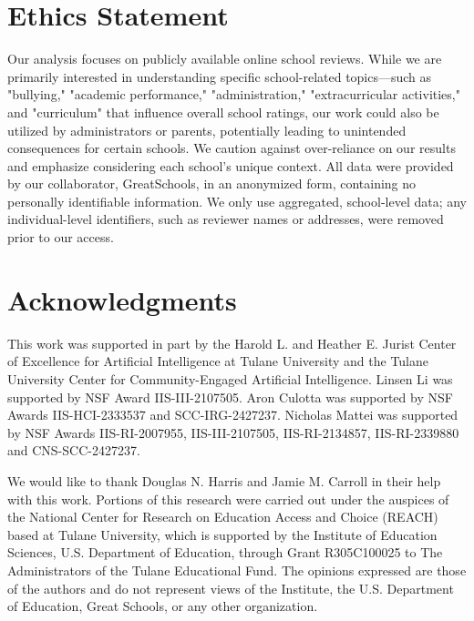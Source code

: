 \documentclass[11pt]{article}
\begin{document}
\section{Ethics Statement}
\label{sec:ethics_statement}
Our analysis focuses on publicly available online school reviews. While we are primarily interested in understanding specific school-related topics—such as "bullying," "academic performance," "administration," "extracurricular activities," and "curriculum" that influence overall school ratings, our work could also be utilized by administrators or parents, potentially leading to unintended consequences for certain schools. We caution against over-reliance on our results and emphasize considering each school's unique context. All data were provided by our collaborator, GreatSchools, in an anonymized form, containing no personally identifiable information. We only use aggregated, school-level data; any individual-level identifiers, such as reviewer names or addresses, were removed prior to our access.

\section*{Acknowledgments}
This work was supported in part by the Harold L. and Heather E. Jurist Center of Excellence for Artificial Intelligence at Tulane University and the Tulane University Center for Community-Engaged Artificial Intelligence. Linsen Li was supported by NSF Award IIS-III-2107505. Aron Culotta was supported by NSF Awards IIS-HCI-2333537 and SCC-IRG-2427237.  Nicholas Mattei was supported by NSF Awards IIS-RI-2007955, IIS-III-2107505, IIS-RI-2134857, IIS-RI-2339880 and CNS-SCC-2427237. 

We would like to thank Douglas N. Harris and Jamie M. Carroll in their help with this work. Portions of this research were carried out under the auspices of the National Center for Research on Education Access and Choice (REACH) based at Tulane University, which is supported by the Institute of Education Sciences, U.S. Department of Education, through Grant R305C100025 to The Administrators of the Tulane Educational Fund. The opinions expressed are those of the authors and do not represent views of the Institute, the U.S. Department of Education, Great Schools, or any other organization.


\clearpage

\end{document}
